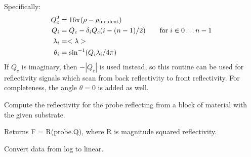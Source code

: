 \documentclass[letterpaper,10pt,english]{sphinxmanual}
\begin{document}
\begin{fulllineitems}
\begin{fulllineitems}
Specifically:
\begin{gather}
\begin{split}Q_c^2 &= 16 \pi (\rho - \rho_\text{incident}) \\
Q_i &= Q_c - \delta_i Q_c (i - (n-1)/2)
    \qquad \text{for} \; i \in 0 \ldots n-1 \\
\lambda_i &= < \lambda > \\
\theta_i &= \sin^{-1}(Q_i \lambda_i / 4 \pi)\end{split}\notag
\end{gather}
If $Q_c$ is imaginary, then $-|Q_c|$ is used instead, so this
routine can be used for reflectivity signals which scan from
back reflectivity to front reflectivity.  For completeness,
the angle $\theta = 0$ is added as well.

\end{fulllineitems}


\begin{fulllineitems}
\label{api/probe:refl1d.probe.QProbe.data}
\end{fulllineitems}


\begin{fulllineitems}
\label{api/probe:refl1d.probe.QProbe.fresnel}
Compute the reflectivity for the probe reflecting from a block of
material with the given substrate.

Returns F = R(probe.Q), where R is magnitude squared reflectivity.

\end{fulllineitems}


\begin{fulllineitems}
\label{api/probe:refl1d.probe.QProbe.label}
\end{fulllineitems}


\begin{fulllineitems}
\label{api/probe:refl1d.probe.QProbe.log10_to_linear}
Convert data from log to linear.


\end{fulllineitems}
\end{fulllineitems}
\end{document}
